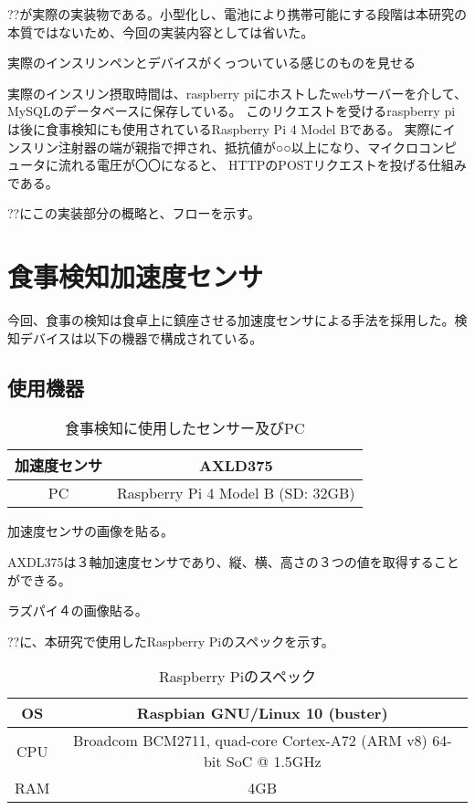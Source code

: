 ??が実際の実装物である。小型化し、電池により携帯可能にする段階は本研究の本質ではないため、今回の実装内容としては省いた。

実際のインスリンペンとデバイスがくっついている感じのものを見せる

実際のインスリン摂取時間は、raspberry piにホストしたwebサーバーを介して、MySQLのデータベースに保存している。
このリクエストを受けるraspberry piは後に食事検知にも使用されているRaspberry Pi 4 Model Bである。
実際にインスリン注射器の端が親指で押され、抵抗値が○○以上になり、マイクロコンピュータに流れる電圧が〇〇になると、
HTTPのPOSTリクエストを投げる仕組みである。

??にこの実装部分の概略と、フローを示す。

\section{食事検知加速度センサ}

今回、食事の検知は食卓上に鎮座させる加速度センサによる手法を採用した。検知デバイスは以下の機器で構成されている。

\subsection{使用機器}

\begin{table}[htbp]
  \caption{食事検知に使用したセンサー及びPC}
  \label{tb:meal_detection_spec}
  \begin{center}
    \begin{tabular}{c||c}
      \hline
      加速度センサ & AXLD375 \\\hline
      PC & Raspberry Pi 4 Model B (SD: 32GB) \\\hline
    \end{tabular}
  \end{center}
\end{table}

加速度センサの画像を貼る。

AXDL375は３軸加速度センサであり、縦、横、高さの３つの値を取得することができる。

ラズパイ４の画像貼る。

??に、本研究で使用したRaspberry Piのスペックを示す。

\begin{table}[htbp]
  \caption{Raspberry Piのスペック}
  \label{tb:raspberry_pi_spec}
  \begin{center}
    \begin{tabular}{c||c}
      \hline
      OS  & Raspbian GNU/Linux 10 (buster) \\\hline
      CPU & Broadcom BCM2711, quad-core Cortex-A72 (ARM v8) 64-bit SoC @ 1.5GHz \\\hline
      RAM & 4GB \\\hline
    \end{tabular}
  \end{center}
\end{table}

